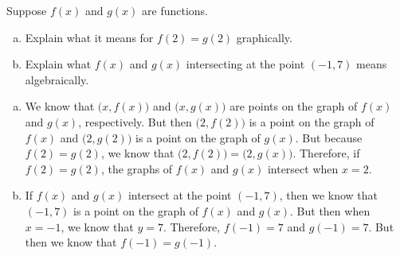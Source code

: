 \documentclass[11pt,letterpaper]{article}
\begin{document}
\newpage



 Suppose $f(x)$ and $g(x)$ are functions. 
	\begin{enumerate}[(a)]
	\item Explain what it means for $f(2)= g(2)$ graphically. 
	\item Explain what $f(x)$ and $g(x)$ intersecting at the point $(-1, 7)$ means algebraically. 
	\end{enumerate} \pspace

\sol 
\begin{enumerate}[(a)]
\item We know that $\big(x, f(x) \big)$ and $\big(x, g(x) \big)$ are points on the graph of $f(x)$ and $g(x)$, respectively. But then $\big(2, f(2) \big)$ is a point on the graph of $f(x)$ and $\big(2, g(2) \big)$ is a point on the graph of $g(x)$. But because $f(2)= g(2)$, we know that $\big(2, f(2) \big)= \big(2, g(x) \big)$. Therefore, if $f(2)= g(2)$, the graphs of $f(x)$ and $g(x)$ intersect when $x= 2$. \pspace

\item If $f(x)$ and $g(x)$ intersect at the point $(-1, 7)$, then we know that $(-1, 7)$ is a point on the graph of $f(x)$ and $g(x)$. But then when $x= -1$, we know that $y= 7$. Therefore, $f(-1)= 7$ and $g(-1)= 7$. But then we know that $f(-1)= g(-1)$. 
\end{enumerate}
\end{document}
